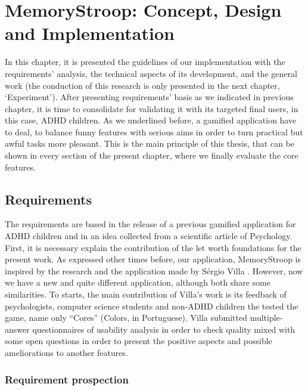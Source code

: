 \chapter{MemoryStroop: Concept, Design and Implementation}
\label{ch:development}

In this chapter, it is presented the guidelines of our implementation with the requirements' analysis, the technical aspects of its development, and the general work  (the conduction of this research is only presented in the next chapter, `Experiment'). After presenting requirements' basis as we indicated in previous chapter, it is time to consolidate for validating it with its targeted final users, in this case, ADHD children. As we underlined before, a gamified application have to deal, to balance funny features with serious aims in order to turn practical but awful tasks more pleasant. This is the main principle of this thesis, that can be shown in every section of the present chapter, where we finally evaluate the core features.

\section{Requirements}

The requirements are based in the release of a previous gamified  application for ADHD children and in an idea collected from a scientific article of Psychology. First, it is necessary explain the contribution of the let worth foundations for the present work. As expressed other times before, our application, MemoryStroop is inspired by the research and the application made by S\'{e}rgio Villa \citep{Villa}. However, now we have a new and quite different application, although both share some similarities. To starts, the main contribution of Villa's work is its feedback of psychologists, computer science students and non-ADHD children the tested the game, name only ``Cores'' (Colors, in Portuguese). Villa submitted multiple-answer questionnaires of usability analysis in order to check quality mixed with some open questions in order to present the positive aspects and possible ameliorations to another features. 

\subsection{Requirement prospection}

